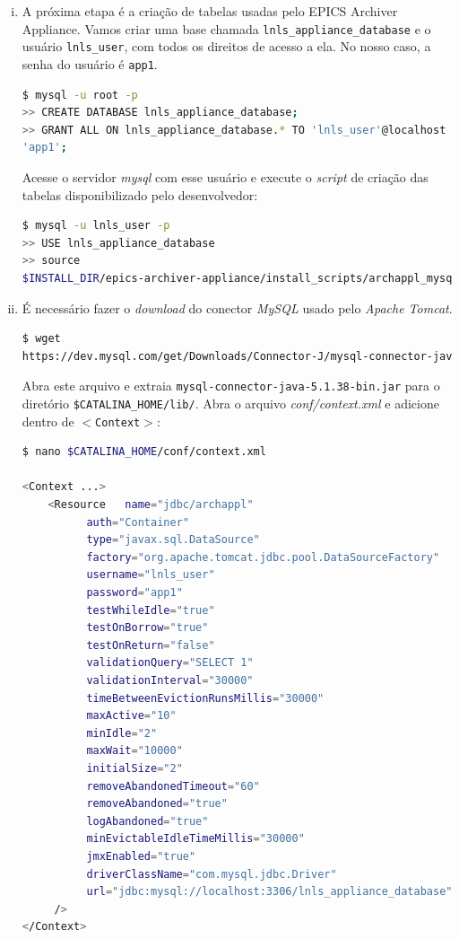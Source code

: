 \begin {enumerate}[i.]
\item A próxima etapa é a criação de tabelas usadas pelo EPICS Archiver
Appliance. Vamos criar uma base chamada \texttt{lnls\_appliance\_database} e o
usuário \texttt{lnls\_user}, com todos os direitos de acesso a ela. No nosso
caso, a senha do usuário é \texttt{app1}. 

\begin{lstlisting}[language=bash, style=nonumbers]
$ mysql -u root -p
>> CREATE DATABASE lnls_appliance_database;
>> GRANT ALL ON lnls_appliance_database.* TO 'lnls_user'@localhost IDENTIFIED BY
'app1';
\end{lstlisting}

Acesse o servidor \textit{mysql} com esse usuário e execute o \textit{script}
de criação das tabelas disponibilizado pelo desenvolvedor:

\begin{lstlisting}[language=bash, style=nonumbers]
$ mysql -u lnls_user -p
>> USE lnls_appliance_database
>> source
$INSTALL_DIR/epics-archiver-appliance/install_scripts/archappl_mysql.sql
\end{lstlisting}

\item É necessário fazer o \textit{download} do conector \textit{MySQL} usado
pelo \textit{Apache Tomcat}.

\begin{lstlisting}[language=bash, style=nonumbers]
$ wget
https://dev.mysql.com/get/Downloads/Connector-J/mysql-connector-java-5.1.38.tar.gz
\end{lstlisting} 

Abra este arquivo e extraia \texttt{mysql-connector-java-5.1.38-bin.jar} para o
diretório \texttt{\$CATALINA\_HOME/lib/}. Abra o arquivo
\textit{conf/context.xml} e adicione dentro de \texttt{\(<\)Context\(>\)}:

\begin{lstlisting}[language=bash, style=nonumbers]
$ nano $CATALINA_HOME/conf/context.xml

<Context ...>
	<Resource   name="jdbc/archappl"
	      auth="Container"
	      type="javax.sql.DataSource"
	      factory="org.apache.tomcat.jdbc.pool.DataSourceFactory"
	      username="lnls_user"
	      password="app1" 
	      testWhileIdle="true"
	      testOnBorrow="true"
	      testOnReturn="false"
	      validationQuery="SELECT 1"
	      validationInterval="30000"
	      timeBetweenEvictionRunsMillis="30000"
	      maxActive="10" 
	      minIdle="2" 
	      maxWait="10000" 
	      initialSize="2"
	      removeAbandonedTimeout="60"
	      removeAbandoned="true"
	      logAbandoned="true"
	      minEvictableIdleTimeMillis="30000" 
	      jmxEnabled="true"
	      driverClassName="com.mysql.jdbc.Driver"
	      url="jdbc:mysql://localhost:3306/lnls_appliance_database"
	 />
</Context>
\end{lstlisting}


\end{enumerate}
